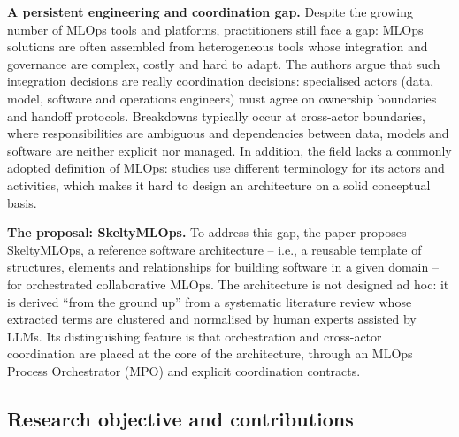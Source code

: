 \documentclass[11pt,a4paper]{article}
\begin{document}
\textbf{A persistent engineering and coordination gap.}
Despite the growing number of MLOps tools and platforms, practitioners still face a gap: MLOps solutions are often assembled from heterogeneous tools whose integration and governance are complex, costly and hard to adapt. The authors argue that such integration decisions are really coordination decisions: specialised actors (data, model, software and operations engineers) must agree on ownership boundaries and handoff protocols. Breakdowns typically occur at cross-actor boundaries, where responsibilities are ambiguous and dependencies between data, models and software are neither explicit nor managed. In addition, the field lacks a commonly adopted definition of MLOps: studies use different terminology for its actors and activities, which makes it hard to design an architecture on a solid conceptual basis.

\textbf{The proposal: SkeltyMLOps.}
To address this gap, the paper proposes SkeltyMLOps, a reference software architecture -- i.e., a reusable template of structures, elements and relationships for building software in a given domain -- for orchestrated collaborative MLOps. The architecture is not designed ad hoc: it is derived ``from the ground up'' from a systematic literature review whose extracted terms are clustered and normalised by human experts assisted by LLMs. Its distinguishing feature is that orchestration and cross-actor coordination are placed at the core of the architecture, through an MLOps Process Orchestrator (MPO) and explicit coordination contracts.

\subsection{Research objective and contributions}
\end{document}
